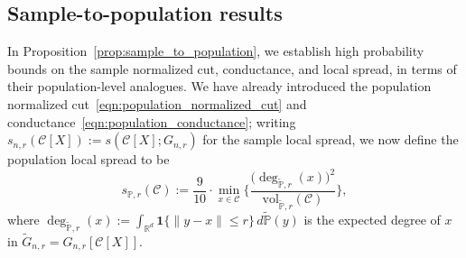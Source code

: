 \documentclass[11pt,twoside]{article}
\newcommand{\Reals}{\mathbb{R}}
\newcommand{\1}{\mathbf{1}}
\newcommand{\Rd}{\Reals^d}
\newcommand{\mc}[1]{\mathcal{#1}}
\newcommand{\Pbb}{\mathbb{P}}
\newcommand{\wt}[1]{\widetilde{#1}}
\newcommand{\vol}{\mathrm{vol}}
\begin{document}
\subsection{Sample-to-population results}
In Proposition~\ref{prop:sample_to_population}, we establish high probability bounds on the sample normalized cut, conductance, and local spread, in terms of their population-level analogues. We have already introduced the population normalized cut~\eqref{eqn:population_normalized_cut} and conductance~\eqref{eqn:population_conductance}; writing $s_{n,r}(\mc{C}[X]) := s(\mc{C}[X];G_{n,r})$ for the sample local spread, we now define the population local spread to be
\begin{equation}
\label{eqn:local_spread}
s_{\Pbb,r}(\mc{C}) := \frac{9}{10} \cdot \min_{x \in \mc{C}} \biggl\{\frac{\bigl(\deg_{\wt{\Pbb},r}(x)\bigr)^2}{\vol_{\wt{\Pbb},r}(\mc{C})} \biggr\},
\end{equation}
where $\deg_{\wt{\Pbb},r}(x) := \int_{\Rd} \1\{\|y - x\| \leq r\} \,d\wt{\Pbb}(y)$ is the expected degree of $x$ in $\wt{G}_{n,r} = G_{n,r}[\mc{C}[X]]$.
\end{document}
